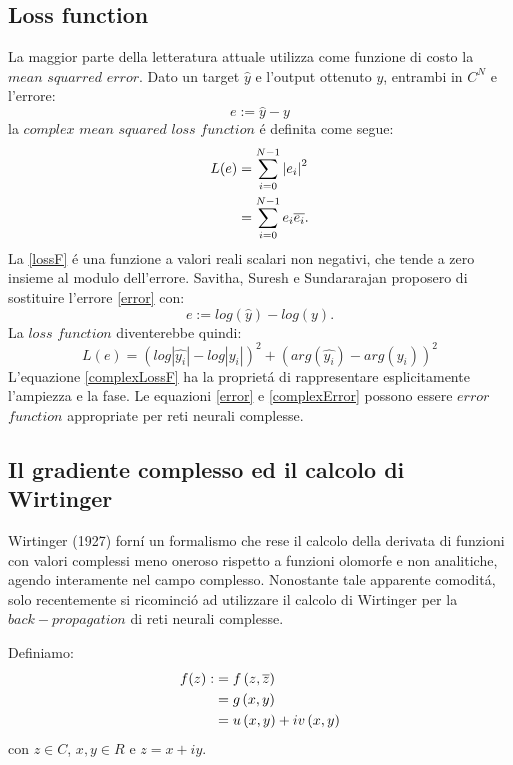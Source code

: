 \documentclass[a4paper,12pt]{report}
\begin{document}
 \subsection{Loss function}
 La maggior parte della letteratura attuale utilizza come funzione di costo la $mean$ $squarred$ $error$. 
 Dato un target $\widehat{y}$ e l'output ottenuto $y$, entrambi in $C^N$ e l'errore: 
 \begin{equation}
  e:=\widehat{y}-y \label{error}
 \end{equation}
 la $complex$ $mean$ $squared$ $loss$ $function$ \'e definita come segue:
 \begin{align}
  L(e) &= \sum_{i=0}^{N-1} \left| e_i\right|^2\label{lossF}\\
  &=\sum_{i=0}^{N-1} e_i \overline{e_i}. \notag
 \end{align}
 La \ref{lossF} \'e una funzione a valori reali scalari non negativi, che tende a zero insieme al modulo dell'errore. 
 Savitha, Suresh e Sundararajan \cite{savitha2009new} proposero di sostituire l'errore \ref{error} con:
 \begin{equation}
  e:=log ( \widehat{y} ) - log ( y ).\label{complexError}
 \end{equation}
 La $loss$ $function$ diventerebbe quindi:
 \begin{equation}
  L(e)=\left( log\left| \widehat{y_i}\right|-log\left| y_i\right|\right)^2 + \left(arg( \widehat{y_i}) - arg  (y_i)\right)^2 \label{complexLossF}
 \end{equation}
 L'equazione \ref{complexLossF} ha la propriet\'a di rappresentare esplicitamente l'ampiezza e la fase.
 Le equazioni \ref{error} e \ref{complexError} possono essere $error$ $function$ appropriate per reti neurali complesse.
 
 \subsection{Il gradiente complesso ed il calcolo di Wirtinger}
 Wirtinger (1927) \cite{wirtinger1927formalen} forn\'i un formalismo che rese il calcolo della derivata di funzioni con valori complessi meno oneroso rispetto a funzioni olomorfe e non analitiche, agendo interamente nel campo complesso. 
 Nonostante tale apparente comodit\'a, solo recentemente si ricominci\'o ad utilizzare il calcolo di Wirtinger per la $back-propagation$ di reti neurali complesse. 

 Definiamo:
 \begin{align}
  f(z) : &= f\left( z,\overline{z}\right)\\
  &= g\left( x,y\right) \notag \\
  &= u\left( x,y\right) +iv\left( x,y\right) \notag
 \end{align}
 con $z\in C$, $x,y\in R$ e $z=x+iy$. 
\end{document}
